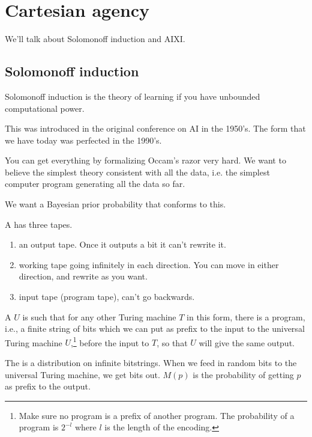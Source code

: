 \documentclass[11pt]{article}
\begin{document}
\section{Cartesian agency}

We'll talk about Solomonoff induction and AIXI. 

\subsection{Solomonoff induction}

Solomonoff induction is the theory of learning if you have unbounded computational power.

This was introduced in the original conference on AI in the 1950's. The form that we have today was perfected in the 1990's.

You can get everything by formalizing Occam's razor very hard. We want to believe the simplest theory consistent with all the data, i.e. the simplest computer program generating all the data so far.

We want a Bayesian prior probability that conforms to this.

\begin{df}
A  has three tapes.
\begin{enumerate}
\item
an output tape. Once it outputs a bit it can't rewrite it.
\item
working tape going infinitely in each direction. You can move in either direction, and rewrite as you want.
\item
input tape (program tape), can't go backwards.
\end{enumerate}

A  $U$ is such that for any other Turing machine $T$ in this form, 
there is a program, i.e., a finite string of bits which we can put as prefix to the input to the universal Turing machine $U$,\footnote{Make sure no program is a prefix of another program. The probability of a program is $2^{-l}$ where $l$ is the length of the encoding.} before the input to $T$, so that $U$ will give the same output.
\end{df}

\begin{df}
The  is a distribution on infinite bitstrings. When we feed in random bits to the universal Turing machine, we get bits out. $M(p)$ is the probability of getting $p$ as prefix to the output.
\end{df}
\end{document}
